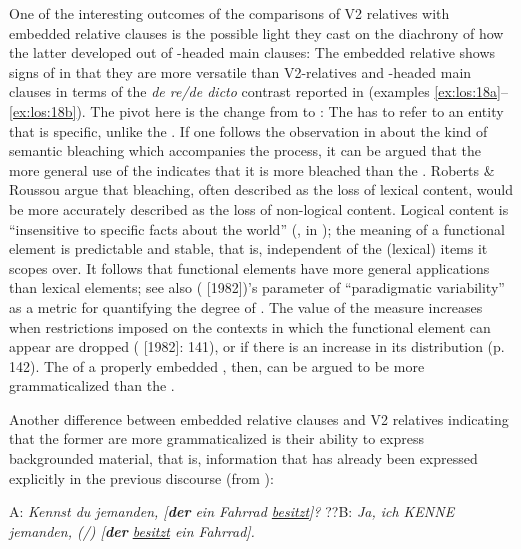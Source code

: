 \documentclass[output=paper,colorlinks,citecolor=brown]{langscibook}
\begin{document}
One of the interesting outcomes of the comparisons of V2 relatives with embedded relative clauses is the possible light they cast on the diachrony of how the latter developed out of -headed main clauses: The embedded relative shows signs of  in that they are more versatile than V2-relatives and -headed main clauses in terms of the \textit{de re/de dicto} contrast reported in  (examples \ref{ex:los:18a}--\ref{ex:los:18b}). The pivot here is the change from  to : The  has to refer to an entity that is specific, unlike the . If one follows the observation in \citet[221]{RobertsRoussou2003} about the kind of semantic bleaching which accompanies the  process, it can be argued that the more general use of the  indicates that it is more bleached than the . Roberts \& Roussou argue that bleaching, often described as the loss of lexical content, would be more accurately described as the loss of non-logical content. Logical content is “insensitive to specific facts about the world” (\citealt{Fintel1995}, in \citealt[221]{RobertsRoussou2003}); the meaning of a functional element is predictable and stable, that is, independent of the (lexical) items it scopes over. It follows that functional elements have more general applications than lexical elements; see also \citeauthor{Lehmann1995} (\citeyear{Lehmann1995} [1982])'s parameter of “paradigmatic variability” as a metric for quantifying the degree of . The value of the measure increases when restrictions imposed on the contexts in which the functional element can appear are dropped (\citealt{Lehmann1995} [1982]: 141), or if there is an increase in its distribution (p. 142). The  of a properly embedded , then, can be argued to be more grammaticalized than the .

Another difference between embedded relative clauses and V2 relatives indicating that the former are more grammaticalized is their ability to express backgrounded material, that is, information that has already been expressed explicitly in the previous discourse (from \citealt[130]{Gärtner2001}):

\ea\label{ex:los:29}
\ea \label{ex:los:29a} A: {\itshape Kennst du jemanden, [\textbf{der} ein Fahrrad \underline{besitzt}]?}
\ex \label{ex:los:29b} ??B: {\itshape Ja, ich KENNE jemanden, (/) [\textbf{der} \underline{besitzt} ein Fahrrad].}
\z
\z
\end{document}

